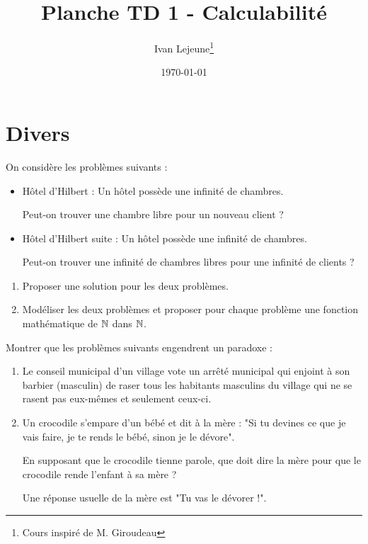 \documentclass[french,a4paper,10pt]{article}
\title{\color{astral} \sffamily \bfseries Planche TD 1 - Calculabilité}
\author{Ivan Lejeune\thanks{Cours inspiré de M. Giroudeau}}
\date{\today}
\begin{document}
	
	\maketitle
	\section{Divers}
	
	\begin{td-exo}
		On considère les problèmes suivants :
			\begin{itemize}
				\item Hôtel d'Hilbert : Un hôtel possède une infinité de chambres.
				
				Peut-on trouver une chambre libre pour un nouveau client ?
				
				\item Hôtel d'Hilbert suite : Un hôtel possède une infinité de chambres.
				
				Peut-on trouver une infinité de chambres libres pour une infinité de clients ?
			\end{itemize}
			
		\begin{enumerate}
			\item Proposer une solution pour les deux problèmes.
			
			\item Modéliser les deux problèmes et proposer pour chaque problème une fonction mathématique de $\mathbb{N}$ dans $\mathbb{N}$.
		\end{enumerate}
	\end{td-exo}
	
	\begin{td-exo}[2 - Paradoxe]
		Montrer que les problèmes suivants engendrent un paradoxe :
			\begin{enumerate}
				\item Le conseil municipal d'un village vote un arrêté municipal qui enjoint à son barbier (masculin) de raser tous les habitants masculins du village qui ne se rasent pas eux-mêmes et seulement ceux-ci.
				
				\item Un crocodile s'empare d'un bébé et dit à la mère : "Si tu devines ce que je vais faire, je te rends le bébé, sinon je le dévore".
				
				En supposant que le crocodile tienne parole, que doit dire la mère pour que le crocodile rende l'enfant à sa mère ?
				
				Une réponse usuelle de la mère est "Tu vas le dévorer !".
			\end{enumerate}
		
	\end{td-exo}
	
\end{document}

